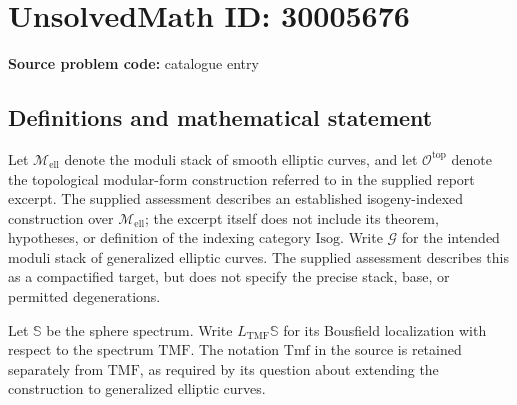 \documentclass[11pt]{article}
\begin{document}
\section*{UnsolvedMath ID: 30005676}
\textbf{Source problem code:} catalogue entry
\subsection{Definitions and mathematical statement}
Let \(\mathcal M_{\mathrm{ell}}\) denote the moduli stack of smooth elliptic curves, and let \(\mathcal O^{\mathrm{top}}\) denote the topological modular-form construction referred to in the supplied report excerpt. The supplied assessment describes an established isogeny-indexed construction over \(\mathcal M_{\mathrm{ell}}\); the excerpt itself does not include its theorem, hypotheses, or definition of the indexing category \(\mathrm{Isog}\). Write \(\mathcal G\) for the intended moduli stack of generalized elliptic curves. The supplied assessment describes this as a compactified target, but does not specify the precise stack, base, or permitted degenerations.

Let \(\mathbb S\) be the sphere spectrum. Write \(L_{\mathrm{TMF}}\mathbb S\) for its Bousfield localization with respect to the spectrum \(\mathrm{TMF}\). The notation \(\mathrm{Tmf}\) in the source is retained separately from \(\mathrm{TMF}\), as required by its question about extending the construction to generalized elliptic curves.
\end{document}
